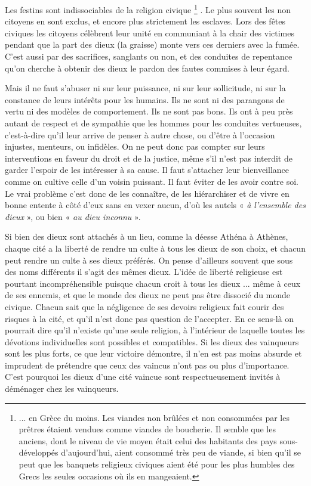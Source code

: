  Les festins sont indissociables de la religion civique%
\footnote{... en Grèce du moins. Les viandes non brûlées et non consommées par les prêtres étaient vendues comme viandes de boucherie. Il semble que les anciens, dont le niveau de vie moyen était celui des habitants des pays sous-développés d'aujourd'hui, aient consommé très peu de viande, si bien qu'il se peut que les banquets religieux civiques aient été pour les plus humbles des Grecs les seules occasions où ils en mangeaient.}%
. Le plus souvent les non citoyens en sont exclus, et encore plus strictement les esclaves. Lors des fêtes civiques les citoyens célèbrent leur unité en communiant à la chair des victimes pendant que la part des dieux (la graisse) monte vers ces derniers avec la fumée. C'est aussi par des sacrifices, sanglants ou non, et des conduites de repentance qu'on cherche à obtenir des dieux le pardon des fautes commises à leur égard. 

 Mais il ne faut s'abuser ni sur leur puissance, ni sur leur sollicitude, ni sur la constance de leurs intérêts pour les humains. Ils ne sont ni des parangons de vertu ni des modèles de comportement. Ils ne sont pas bons. Ils ont à peu près autant de respect et de sympathie que les hommes pour les conduites vertueuses, c'est-à-dire qu'il leur arrive de penser à autre chose, ou d'être à l'occasion injustes, menteurs, ou infidèles. On ne peut donc pas compter sur leurs interventions en faveur du droit et de la justice, même s'il n'est pas interdit de garder l'espoir de les intéresser à sa cause. Il faut s'attacher leur bienveillance comme on cultive celle d'un voisin puissant. Il faut éviter de les avoir contre soi. Le vrai problème c'est donc de les connaître, de les hiérarchiser et de vivre en bonne entente à côté d'eux sans en vexer aucun, d'où les autels « \emph{à l'ensemble des dieux} », ou bien « \emph{au dieu inconnu} ». 

 Si bien des dieux sont attachés à un lieu, comme la déesse Athéna à Athènes, chaque cité a la liberté de rendre un culte à tous les dieux de son choix, et chacun peut rendre un culte à ses dieux préférés. On pense d'ailleurs souvent que sous des noms différents il s'agit des mêmes dieux. L'idée de liberté religieuse est pourtant incompréhensible puisque chacun croit à tous les dieux ... même à ceux de ses ennemis, et que le monde des dieux ne peut pas être dissocié du monde civique. Chacun sait que la négligence de ses devoirs religieux fait courir des risques à la cité, et qu'il n'est donc pas question de l'accepter. En ce sens-là on pourrait dire qu'il n'existe qu'une seule religion, à l'intérieur de laquelle toutes les dévotions individuelles sont possibles et compatibles. Si les dieux des vainqueurs sont les plus forts, ce que leur victoire démontre, il n'en est pas moins absurde et imprudent de prétendre que ceux des vaincus n'ont pas ou plus d'importance. C'est pourquoi les dieux d'une cité vaincue sont respectueusement invités à déménager chez les vainqueurs. 

